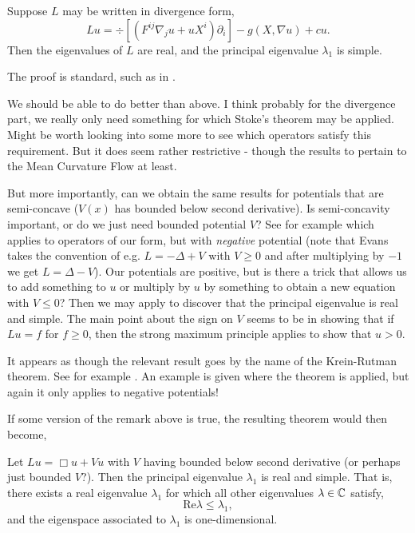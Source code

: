 \documentclass{amsart}
\begin{document}
\begin{thm}
Suppose \(L\) may be written in divergence form,
\[
L u = \div\left[\left(F^{ij} \nabla_j u + u X^i\right)\partial_i\right] - g(X, \nabla u) + c u.
\]
Then the eigenvalues of \(L\) are real, and the principal eigenvalue \(\lambda_1\) is simple.
\end{thm}

The proof is standard, such as in \cite[Theorems 8.37, 8.38]{GilbargTrudinger:/2001}.

\begin{rem}
We should be able to do better than above. I think probably for the divergence part, we really only need something for which Stoke's theorem may be applied. Might be worth looking into some more to see which operators satisfy this requirement. But it does seem rather restrictive - though the results to pertain to the Mean Curvature Flow at least.
\end{rem}

\begin{rem}
But more importantly, can we obtain the same results for potentials that are semi-concave (\(V(x)\) has bounded below second derivative). Is semi-concavity important, or do we just need bounded potential \(V\)? See for example \cite[Theorem 6.5.3]{Evans:/1998} which applies to operators of our form, but with \emph{negative} potential (note that Evans takes the convention of e.g. \(L = -\Delta + V\) with \(V \geq 0\) and after multiplying by \(-1\) we get \(L = \Delta - V\)). Our potentials are positive, but is there a trick that allows us to add something to \(u\) or multiply by \(u\) by something to obtain a new equation with \(V \leq 0\)? Then we may apply \cite[Theorem 6.5.3]{Evans:/1998} to discover that the principal eigenvalue is real and simple. The main point about the sign on \(V\) seems to be in showing that if \(Lu = f\) for \(f \geq 0\), then the strong maximum principle applies to show that \(u > 0\).

It appears as though the relevant result goes by the name of the Krein-Rutman theorem. See for example \cite[Appendix C, Chapter 11]{smoller:/1983}. An example is given where the theorem is applied, but again it only applies to negative potentials!
\end{rem}

If some version of the remark above is true, the resulting theorem would then become,
\begin{thm}
Let \(L u = \Box u + V u\) with \(V\) having bounded below second derivative (or perhaps just bounded \(V\)?). Then the principal eigenvalue \(\lambda_1\) is real and simple. That is, there exists a real eigenvalue \(\lambda_1\) for which all other eigenvalues \(\lambda \in \mathbb{C}\) satisfy,
\[
\text{Re} \lambda \leq \lambda_1,
\]
and the eigenspace associated to \(\lambda_1\) is one-dimensional.
\end{thm}
\end{document}
